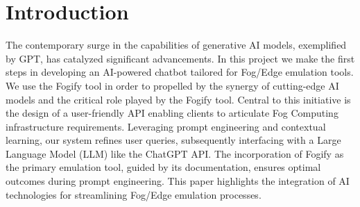 \section{Introduction}
\label{sec:introduction}

The contemporary surge in the capabilities of generative AI models, exemplified
by GPT, has catalyzed significant advancements.
In this project we make the first steps in developing an AI-powered chatbot
tailored for Fog/Edge emulation tools. We use the Fogify tool in order to
propelled
by the synergy of cutting-edge AI models and the critical role played by the
Fogify tool. Central to this initiative is the design of a user-friendly API
enabling clients to articulate Fog Computing infrastructure requirements.
Leveraging prompt engineering and contextual learning, our system refines user
queries, subsequently interfacing with a Large Language Model (LLM) like the
ChatGPT API. The incorporation of Fogify as the primary emulation tool, guided
by its documentation, ensures optimal outcomes during prompt engineering. This
paper highlights the integration of AI technologies for streamlining Fog/Edge
emulation processes.
